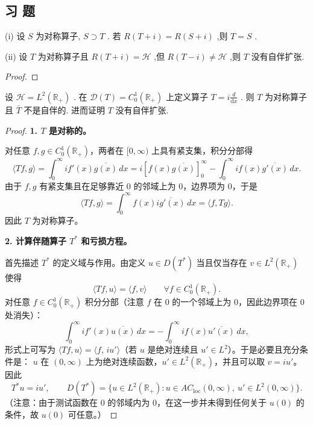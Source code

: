 \documentclass[lang=cn,newtx,10pt,scheme=chinese,thmcnt=chapter]{elegantbook}
\newcommand{\dif}{\mathrm{d}}
\begin{document}
\subsection{习 题}
\begin{problemset}
    \item  (i) 设 \(S\) 为对称算子, \(S \supset  T\) . 若 \(R\left( {T + i}\right)  = R\left( {S + i}\right)\) ,则 \(T = S\) .

(ii) 设 \(T\) 为对称算子且 \(R\left( {T + i}\right)  = \mathcal{H}\) ,但 \(R\left( {T - i}\right)  \neq  \mathcal{H}\) ,则 \(T\) 没有自伴扩张.
\begin{proof}
    
\end{proof}
\item  设 \(\mathcal{H} = {L}^{2}\left( {\mathbb{R}}_{ + }\right)\) . 在 \(\mathcal{D}(T)  = {C}_{0}^{1}\left( {\mathbb{R}}_{ + }\right)\) 上定义算子 \(T = i\frac{d}{\dif x}\) . 则 \(T\) 为对称算子且 \(\bar{T}\) 不是自伴的. 进而证明 \(T\) 没有自伴扩张.

    
\begin{proof}
\textbf{1. $T$ 是对称的。}

对任意 $f,g\in C_0^1(\mathbb R_+)$，两者在 $[0,\infty)$ 上具有紧支集，积分分部得
\[
\langle Tf,g\rangle
= \int_0^\infty i f'(x)\overline{g(x)}\,dx
= i\left[f(x)\overline{g(x)}\right]_{0}^{\infty}
- \int_0^\infty i f(x)\overline{g'(x)}\,dx.
\]
由于 $f,g$ 有紧支集且在足够靠近 $0$ 的邻域上为 $0$，边界项为 $0$，于是
\[
\langle Tf,g\rangle = \int_0^\infty f(x)\overline{i g'(x)}\,dx
= \langle f,Tg\rangle.
\]
因此 $T$ 为对称算子。

\textbf{2. 计算伴随算子 $T^*$ 和亏损方程。}

首先描述 $T^*$ 的定义域与作用。由定义 $u\in D(T^*)$ 当且仅当存在 $v\in L^2(\mathbb R_+)$ 使得
\[
\langle Tf,u\rangle=\langle f,v\rangle\qquad\forall f\in C_0^1(\mathbb R_+).
\]
对任意 $f\in C_0^1(\mathbb R_+)$ 积分分部（注意 $f$ 在 $0$ 的一个邻域上为 $0$，因此边界项在 $0$ 处消失）：
\[
\int_0^\infty i f'(x)\overline{u(x)}\,dx
= -\int_0^\infty i f(x)\overline{u'(x)}\,dx,
\]
形式上可写为 $\langle Tf,u\rangle=\langle f,\,i u'\rangle$（若 $u$ 是绝对连续且 $u'\in L^2$）。于是必要且充分条件是：  
\(u\) 在 $(0,\infty)$ 上为绝对连续函数，$u'\in L^2(\mathbb R_+)$，并且可以取 $v=i u'$。 因此
\[
T^* u = i u',\qquad
D(T^*)=\{u\in L^2(\mathbb R_+): u\in AC_{\mathrm{loc}}(0,\infty),\ u'\in L^2(0,\infty)\}.
\]
（注意：由于测试函数在 $0$ 的邻域内为 $0$，在这一步并未得到任何关于 $u(0)$ 的条件，故 $u(0)$ 可任意。）


\end{proof}
\end{problemset}
\end{document}

